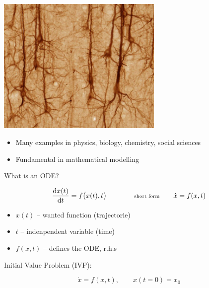 \documentclass{beamer}
\newcommand{\de}{\mbox{d}}
\newcommand{\heading}[1]{\centerline{\Large #1} \vspace{0.5em}}
\begin{document}
\begin{frame}
\begin{minipage}{0.48\textwidth}
\begin{center}
  \includegraphics[draft=false,width=0.6\textwidth]{neuron.jpg}
 \end{center}
\end{minipage}
\vspace{2ex}

\begin{itemize}
 \item Many examples in physics, biology, chemistry, social sciences
 \item Fundamental in mathematical modelling
\end{itemize}

\end{frame}

\begin{frame}
 
 \heading{What is an ODE?}

 $$\frac{\de x(t)}{\de t} = f\big(x(t) , t\big) \qquad \qquad {\scriptsize \text{short form}} \qquad \dot{x} = f(x,t)
$$

 \begin{itemize}
  \item $x(t)$ -- wanted function (trajectorie)
  \item $t$ -- indenpendent variable (time)
  \item $f(x,t)$ -- defines the ODE, r.h.s
 \end{itemize}

\vspace{4ex}

 Initial Value Problem (IVP):

 $$\dot x = f( x , t ) ,\qquad x(t=0) = x_0$$

\end{frame}
\end{document}
